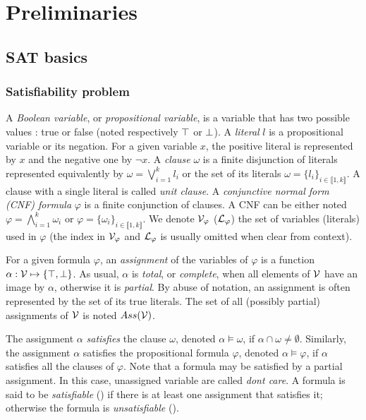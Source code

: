 \chapter{Preliminaries}\label{chap:preliminaries}

\section{SAT basics}

\subsection{Satisfiability problem}
A \emph{Boolean variable}, or \emph{propositional variable}, is a variable that
has two possible values : true or false (noted respectively $\top$ or $\bot$).
A \emph{literal} $l$ is a propositional variable or its
negation. For a given variable $x$, the positive literal is represented by $x$
and the negative one by $\neg x$.
A \emph{clause} $\omega$ is a finite disjunction of literals represented
equivalently by $\omega = \bigvee_{i=1}^k l_i$ or the set of its literals
$\omega = \{l_i\}_{i \in \llbracket 1,k \rrbracket}$. A clause with a single
literal is called \emph{unit clause}.
A \emph{conjunctive normal form (CNF) formula} $\varphi$ is a finite
conjunction of clauses.  A CNF can be either noted $\varphi = \bigwedge_{i=1}^k
\omega_i$ or $\varphi = \{\omega_i\}_{i \in \llbracket 1,k \rrbracket}$. We
denote $\mathcal{V}_\varphi$ ($\mathcal{L}_\varphi$) the set of variables (literals) used in
$\varphi$ (the index in $\mathcal{V}_\varphi$ and $\mathcal{L}_\varphi$ is usually omitted when
clear from context).

For a given formula $\varphi$, an \emph{assignment} of the variables of
$\varphi$ is a function $\alpha: \mathcal{V} \mapsto \{ \top, \bot \}$.  As usual, $\alpha$ is
\emph{total}, or \emph{complete}, when all elements of $\mathcal{V}$ have an image by
$\alpha$, otherwise it is \emph{partial}. By abuse of notation, an assignment is
often represented by the set of its true literals.  The set of all (possibly
partial) assignments of $\mathcal{V}$ is noted $Ass(\mathcal{V})$.

The assignment $\alpha$ \emph{satisfies} the clause $\omega$, denoted $\alpha
\models \omega$, if $\alpha \cap \omega \neq \emptyset$. Similarly, the assignment
$\alpha$ satisfies the propositional formula $\varphi$, denoted $\alpha \models
\varphi$, if $\alpha$ satisfies all the clauses of $\varphi$. Note that a
formula may be satisfied by a partial assignment. In this case, unassigned variable are called
\emph{dont care}.
A formula is said to be
\emph{satisfiable} (\sat) if there is at least one assignment that satisfies it;
otherwise the formula is \emph{unsatisfiable} (\unsat).

